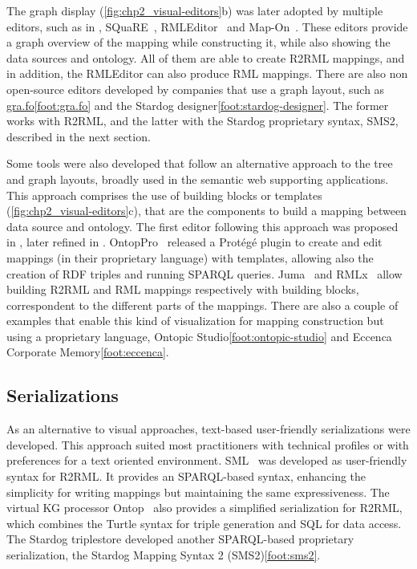 The graph display (\cref{fig:chp2_visual-editors}b) was later adopted by multiple editors, such as in \cite{lembo2014visualization}, SQuaRE~\parencite{blinkiewicz2016square}, RMLEditor~\parencite{heyvaert2016rmleditor} and Map-On~\parencite{sicilia2017map}. These editors provide a graph overview of the mapping while constructing it, while also showing the data sources and ontology. All of them are able to create R2RML mappings, and in addition, the RMLEditor can also produce RML mappings. There are also non open-source editors developed by companies that use a graph layout, such as \url{gra.fo}\cref{foot:gra.fo} and the Stardog designer\cref{foot:stardog-designer}. The former works with R2RML, and the latter with the Stardog proprietary syntax, SMS2, described in the next section. 


Some tools were also developed that follow an alternative approach to the tree and graph layouts, broadly used in the semantic web supporting applications. This approach comprises the use of building blocks or templates (\cref{fig:chp2_visual-editors}c), that are the components to build a mapping between data source and ontology. The first editor following this approach was proposed in \cite{sengupta2013editing}, later refined in \cite{pinkel2014best}. OntopPro~\parencite{calvanese2017ontop} released a Protégé plugin to create and edit mappings (in their proprietary language) with templates, allowing also the creation of RDF triples and running SPARQL queries. Juma~\parencite{junior2017juma} and RMLx~\parencite{aryan2017rmlx} allow building R2RML and RML mappings respectively with building blocks, correspondent to the different parts of the mappings. There are also a couple of examples that enable this kind of visualization for mapping construction but using a proprietary language, Ontopic Studio\cref{foot:ontopic-studio} and Eccenca Corporate Memory\cref{foot:eccenca}. 



\subsection{Serializations}
\label{sec:chp2_serializations}

As an alternative to visual approaches, text-based user-friendly serializations were developed. This approach suited most practitioners with technical profiles or with preferences for a text oriented environment. 
SML~\parencite{Stadler2015sml} was developed as user-friendly syntax for R2RML. It provides an SPARQL-based syntax, enhancing the simplicity for writing mappings but maintaining the same expressiveness. 
The virtual KG processor Ontop~\parencite{calvanese2017ontop} also provides a simplified serialization for R2RML, which combines the Turtle syntax for triple generation and SQL for data access. 
The Stardog triplestore developed another SPARQL-based proprietary serialization, the Stardog Mapping Syntax 2 (SMS2)\cref{foot:sms2}. 

